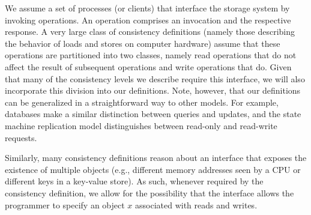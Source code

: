 \documentclass[journal,compsoc]{IEEEtran}
\begin{document}
We assume a set of processes (or clients) that interface the storage system by invoking operations. An operation comprises an invocation and the respective response. A very large class of consistency definitions (namely those describing the behavior of loads and stores on computer hardware) assume that these operations are partitioned into two classes, namely read operations that do not affect the result of subsequent operations and write operations that do. Given that many of the consistency levels we describe require this interface, we will also incorporate this division into our definitions. Note, however, that our definitions can be generalized in a straightforward way to other models. For example, databases make a similar distinction between queries and updates, and the state machine replication model distinguishes between read-only and read-write requests.

Similarly, many consistency definitions reason about an interface that exposes the existence of multiple objects (e.g., different memory addresses seen by a CPU or different keys in a key-value store). As such, whenever required by the consistency definition, we allow for the possibility that the interface allows the programmer to specify an object $x$ associated with reads and writes.

\end{document}
